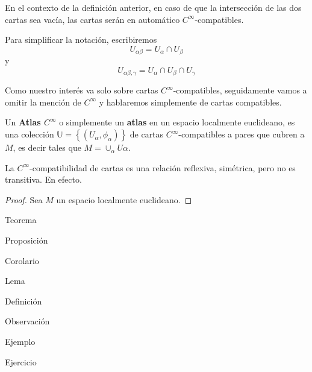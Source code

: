 \documentclass[12pt]{report}
\theoremstyle{largebreak}
\begin{document}
    \begin{obs}
        En el contexto de la definición anterior, en caso de que la intersección de las dos cartas sea vacía, las cartas serán en automático $C^{\infty}$-compatibles.

        Para simplificar la notación, escribiremos
        \begin{equation*}
            U_{\alpha\beta}=U_{\alpha}\cap U_{\beta}
        \end{equation*}
        y
        \begin{equation*}
            U_{\alpha\beta,\gamma}=U_{\alpha}\cap U_{\beta}\cap U_{\gamma}
        \end{equation*}
    \end{obs}

    Como nuestro interés va solo sobre cartas $C^{\infty}$-compatibles, seguidamente vamos a omitir la mención de $C^{\infty}$ y hablaremos simplemente de cartas compatibles.

    \begin{mydef}
        Un \textbf{Atlas $C^{\infty}$} o simplemente un \textbf{atlas} en un espacio localmente euclideano, es una colección $\mathbb{U}=\left\{(U_\alpha, \phi_\alpha)\right\}$ de cartas $C^{\infty}$-compatibles a pares que cubren a $M$, es decir tales que $M=\cup_{\alpha}U\alpha$. 
    \end{mydef}

    \begin{obs}
        La $C^{\infty}$-compatibilidad de cartas es una relación reflexiva, simétrica, pero no es transitiva. En efecto.
    \end{obs}
    \begin{proof}
        Sea $M$ un espacio localmente euclideano. 
    \end{proof}

    \newpage

    \begin{theor}[Nombre]
        Teorema
    \end{theor}

    \begin{propo}[Nombre]
        Proposición
    \end{propo}

    \begin{cor}[Nombre]
        Corolario
    \end{cor}

    \begin{lema}[Nombre]
        Lema
    \end{lema}

    \begin{mydef}[Nombre]
        Definición
    \end{mydef}

    \begin{obs}[Nombre]
        Observación
    \end{obs}

    \begin{exa}[Nombre]
        Ejemplo
    \end{exa}

    \begin{excer}[Nombre]
        Ejercicio
    \end{excer}
\end{document}
